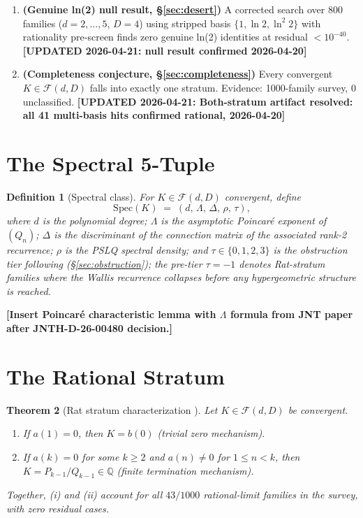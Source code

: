 \documentclass[12pt]{amsart}
\newcommand{\PLACEHOLDER}[1]{{\color{red}\textbf{[#1]}}}
\newcommand{\UPDATED}[1]{{\color{teal}\textbf{[UPDATED 2026-04-21: #1]}}}
\newtheorem{theorem}{Theorem}[section]
\newtheorem{definition}[theorem]{Definition}
\begin{document}
\begin{enumerate}
\item \textbf{(Genuine ln(2) null result,
  \S\ref{sec:desert})}
  A corrected search over 800 families
  ($d=2,\ldots,5$, $D=4$) using stripped
  basis $\{1,\ln 2,\ln^2 2\}$ with
  rationality pre-screen finds zero genuine
  ln(2) identities at residual $<10^{-40}$.
  \UPDATED{null result confirmed 2026-04-20}

\item \textbf{(Completeness conjecture,
  \S\ref{sec:completeness})}
  Every convergent $K\in\mathcal{F}(d,D)$
  falls into exactly one stratum.
  Evidence: 1000-family survey,
  0 unclassified.
  \UPDATED{Both-stratum artifact resolved:
  all 41 multi-basis hits confirmed rational,
  2026-04-20}
\end{enumerate}

\section{The Spectral 5-Tuple}
\label{sec:spectral}

\begin{definition}[Spectral class]
For $K \in \mathcal{F}(d,D)$ convergent, define
\[
  \mathrm{Spec}(K) \;=\;
  (d,\,\Lambda,\,\Delta,\,\rho,\,\tau),
\]
where $d$ is the polynomial degree; $\Lambda$ is
the asymptotic Poincar\'e exponent of $(Q_n)$;
$\Delta$ is the discriminant of the connection
matrix of the associated rank-2 recurrence;
$\rho$ is the PSLQ spectral density; and
$\tau \in \{0,1,2,3\}$ is the obstruction
tier following \cite{Obstruction}
(\S\ref{sec:obstruction}); the pre-tier
$\tau = -1$ denotes Rat-stratum families
where the Wallis recurrence collapses before
any hypergeometric structure is reached.
\end{definition}

\PLACEHOLDER{Insert Poincar\'e characteristic
lemma with $\Lambda$ formula from JNT paper
after JNTH-D-26-00480 decision.}

\section{The Rational Stratum}
\label{sec:rat}

\begin{theorem}[Rat stratum characterization
  {\cite{Rat}}]
\label{thm:rat}
Let $K \in \mathcal{F}(d,D)$ be convergent.
\begin{enumerate}
\item[(i)] If $a(1)=0$, then $K=b(0)$
  (trivial zero mechanism).
\item[(ii)] If $a(k)=0$ for some $k\geq 2$
  and $a(n)\neq 0$ for $1\leq n<k$,
  then $K=P_{k-1}/Q_{k-1}\in\mathbb{Q}$
  (finite termination mechanism).
\end{enumerate}
Together, (i) and (ii) account for all
$43/1000$ rational-limit families in the
survey, with zero residual cases.
\end{theorem}
\end{document}
